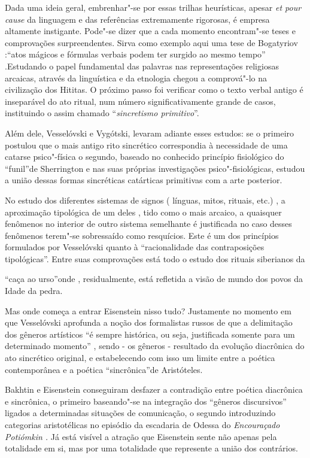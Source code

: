 Dada uma ideia geral, embrenhar"-se por essas trilhas heurísticas, apesar
\emph{et pour cause} da linguagem e das referências extremamente
rigorosas, é empresa altamente instigante. Pode"-se dizer que a cada
momento encontram"-se teses e comprovações surpreendentes. Sirva como
exemplo aqui uma tese de Bogatyriov :``atos mágicos e fórmulas verbais
podem ter surgido ao mesmo tempo'' .Estudando o papel fundamental das
palavras nas representações religiosas arcaicas, através da linguística
e da etnologia chegou a comprová"-lo na civilização dos Hititas. O
próximo passo foi verificar como o texto verbal antigo é inseparável do
ato ritual, num número significativamente grande de casos, instituindo o
assim chamado ``\emph{sincretismo primitivo}''.

Além dele, Vesselóvski e Vygótski, levaram adiante esses estudos: se o
primeiro postulou que o mais antigo rito sincrético correspondia à
necessidade de uma catarse psico"-física o segundo, baseado no conhecido
princípio fisiológico do ``funil''de Sherrington e nas suas próprias
investigações psico"-fisiológicas, estudou a união dessas formas
sincréticas catárticas primitivas com a arte posterior.

No estudo dos diferentes sistemas de signos ( línguas, mitos, rituais,
etc.) , a aproximação tipológica de um deles , tido como o mais arcaico,
a quaisquer fenômenos no interior de outro sistema semelhante é
justificada no caso desses fenômenos terem"-se sobressaído como
resquícios. Este é um dos princípios formulados por Vesselóvski quanto à
``racionalidade das contraposições tipológicas''. Entre suas
comprovações está todo o estudo dos rituais siberianos da

``caça ao urso''onde , residualmente, está refletida a visão de mundo
dos povos da Idade da pedra.

Mas onde começa a entrar Eisenstein nisso tudo? Justamente no momento em
que Vesselóvski aprofunda a noção dos formalistas russos de que a
delimitação dos gêneros artísticos ``é sempre histórica, ou seja,
justificada somente para um determinado momento'' , sendo - os gêneros -
resultado da evolução diacrônica do ato sincrético original, e
estabelecendo com isso um limite entre a poética contemporânea e a
poética ``sincrônica''de Aristóteles.

Bakhtin e Eisenstein conseguiram desfazer a contradição entre poética
diacrônica e sincrônica, o primeiro baseando"-se na integração dos
``gêneros discursivos'' ligados a determinadas situações de comunicação,
o segundo introduzindo categorias aristotélicas no episódio da escadaria
de Odessa do \emph{Encouraçado Potiómkin .} Já está visível a atração
que Eisenstein sente não apenas pela totalidade em si, mas por uma
totalidade que represente a união dos contrários.

